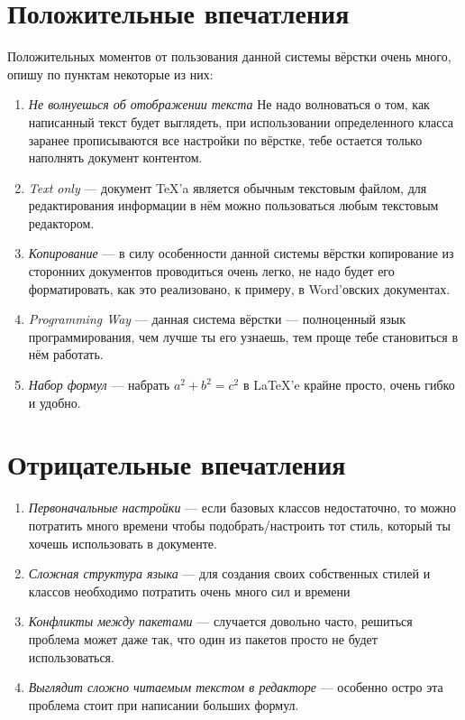 \documentclass[utf8x, 12pt]{G7-32}
\begin{document}
\chapter{Положительные впечатления}

Положительных моментов от пользования данной системы вёрстки очень много, опишу по пунктам некоторые из них:

\begin{enumerate}
	\item {\it Не волнуешься об отображении текста} Не надо волноваться о том, как написанный текст будет выглядеть, при использовании определенного класса заранее прописываются все настройки по вёрстке, тебе остается только наполнять документ контентом.
	\item {\it Text only} --- документ \TeX 'a является обычным текстовым файлом, для редактирования информации в нём можно пользоваться любым текстовым редактором.
	\item {\it Копирование} --- в силу особенности данной системы вёрстки копирование из сторонних документов проводиться очень легко, не надо будет его форматировать, как это реализовано, к примеру, в Word'овских документах.
	\item {\it Programming Way} --- данная система вёрстки --- полноценный язык программирования, чем лучше ты его узнаешь, тем проще тебе становиться в нём работать. 
	\item {\it Набор формул} --- набрать $a^2 + b^2 = c^2$ в \LaTeX 'e крайне просто, очень гибко и удобно.
\end{enumerate}



\chapter{Отрицательные впечатления}

\begin{enumerate}
	\item {\it Первоначальные настройки} --- если базовых классов недостаточно, то можно потратить много времени чтобы подобрать/настроить тот стиль, который ты хочешь использовать в документе.
	\item {\it Сложная структура языка} --- для создания своих собственных стилей и классов необходимо потратить очень много сил и времени
	\item {\it Конфликты между пакетами} --- случается довольно часто, решиться проблема может даже так, что один из пакетов просто не будет использоваться.
	\item {\it Выглядит сложно читаемым текстом в редакторе} --- особенно остро эта проблема стоит при написании больших формул.

\end{enumerate}
\end{document}
